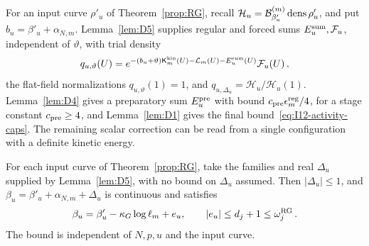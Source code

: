 For an input curve $\rho'_u$ of Theorem~\ref{prop:RG}, recall $\mathcal H_u=\mathcal{B}^{(m)}_{\beta'_u}\operatorname{dens}\rho'_u$, and put $b_u=\beta'_u+\alpha_{N,m}$. Lemma~\ref{lem:D5} supplies regular and forced sums $E_u^{\rm sum},\mathcal F_u$, independent of $\vartheta$, with trial density
\begin{equation*}
q_{u,\vartheta}(U)=e^{-(b_u+\vartheta)\mathsf K^{\rm kin}_m(U)-\mathcal L_m(U)-E_u^{\rm sum}(U)}\mathcal F_u(U)\,,
\end{equation*}
the flat-field normalizations $q_{u,\vartheta}(1)=1$, and $q_{u,\Delta_u}=\mathcal H_u/\mathcal H_u(1)$. Lemma~\ref{lem:D4} gives a preparatory sum $E_u^{\rm pre}$ with bound $c_{\rm pre}\epsilon_m^{\rm reg}/4$, for a stage constant $c_{\rm pre}\ge4$, and Lemma~\ref{lem:D1} gives the final bound~\eqref{eq:I12-activity-caps}. The remaining scalar correction can be read from a single configuration with a definite kinetic energy.

\begin{lemma}\label{lem:C8}
For each input curve of Theorem~\ref{prop:RG}, take the families and real $\Delta_u$ supplied by Lemma~\ref{lem:D5}, with no bound on $\Delta_u$ assumed. Then $|\Delta_u|\le1$, and $\beta_u=\beta'_u+\alpha_{N,m}+\Delta_u$ is continuous and satisfies
\begin{equation*}
\beta_u=\beta'_u-\kappa_G\log\ell_m+e_u,\qquad
|e_u|\le d_j+1\le\omega_j^{\rm RG}\,.
\end{equation*}
The bound is independent of $N,p,u$ and the input curve.
\end{lemma}

